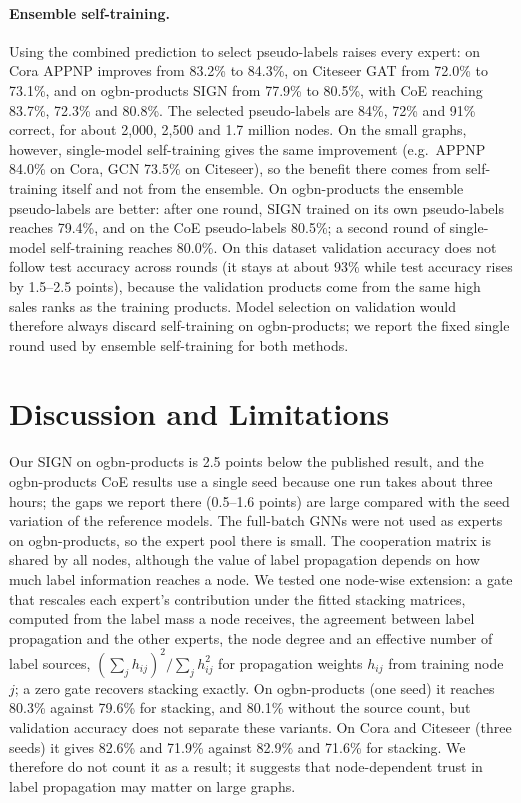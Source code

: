 \documentclass[sigconf,nonacm]{acmart}
\begin{document}
\paragraph{Ensemble self-training.}
Using the combined prediction to select pseudo-labels raises every expert: on Cora APPNP improves from 83.2\% to 84.3\%, on Citeseer GAT from 72.0\% to 73.1\%, and on ogbn-products SIGN from 77.9\% to 80.5\%, with CoE reaching 83.7\%, 72.3\% and 80.8\%.
The selected pseudo-labels are 84\%, 72\% and 91\% correct, for about 2{,}000, 2{,}500 and 1.7 million nodes.
On the small graphs, however, single-model self-training gives the same improvement (e.g.\ APPNP 84.0\% on Cora, GCN 73.5\% on Citeseer), so the benefit there comes from self-training itself and not from the ensemble.
On ogbn-products the ensemble pseudo-labels are better: after one round, SIGN trained on its own pseudo-labels reaches 79.4\%, and on the CoE pseudo-labels 80.5\%; a second round of single-model self-training reaches 80.0\%.
On this dataset validation accuracy does not follow test accuracy across rounds (it stays at about 93\% while test accuracy rises by 1.5--2.5 points), because the validation products come from the same high sales ranks as the training products.
Model selection on validation would therefore always discard self-training on ogbn-products; we report the fixed single round used by ensemble self-training for both methods.

\section{Discussion and Limitations}

Our SIGN on ogbn-products is 2.5 points below the published result, and the ogbn-products CoE results use a single seed because one run takes about three hours; the gaps we report there (0.5--1.6 points) are large compared with the seed variation of the reference models.
The full-batch GNNs were not used as experts on ogbn-products, so the expert pool there is small.
The cooperation matrix is shared by all nodes, although the value of label propagation depends on how much label information reaches a node.
We tested one node-wise extension: a gate that rescales each expert's contribution under the fitted stacking matrices, computed from the label mass a node receives, the agreement between label propagation and the other experts, the node degree and an effective number of label sources, $(\sum_j h_{ij})^2/\sum_j h_{ij}^2$ for propagation weights $h_{ij}$ from training node $j$; a zero gate recovers stacking exactly.
On ogbn-products (one seed) it reaches 80.3\% against 79.6\% for stacking, and 80.1\% without the source count, but validation accuracy does not separate these variants.
On Cora and Citeseer (three seeds) it gives 82.6\% and 71.9\% against 82.9\% and 71.6\% for stacking.
We therefore do not count it as a result; it suggests that node-dependent trust in label propagation may matter on large graphs.
\end{document}
